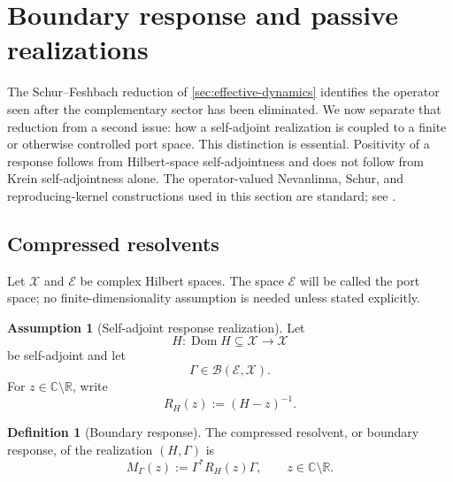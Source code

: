 \documentclass[11pt,reqno]{scrartcl}
\newcommand{\CC}{\mathbb C}
\newcommand{\RR}{\mathbb R}
\DeclareMathOperator{\Dom}{Dom}
\newcommand{\scrX}{\mathscr X}
\newcommand{\scrE}{\mathscr E}
\newcommand{\Mresp}{M_{\Gamma}}
\theoremstyle{plain}
\theoremstyle{definition}
\newtheorem{definition}[definition]{Definition}
\newtheorem{assumption}[assumption]{Assumption}
\theoremstyle{remark}
\begin{document}
\section{Boundary response and passive realizations}
\label{sec:boundary-response}

The Schur--Feshbach reduction of \cref{sec:effective-dynamics} identifies the
operator seen after the complementary sector has been eliminated.  We now
separate that reduction from a second issue: how a self-adjoint realization
is coupled to a finite or otherwise controlled port space.  This distinction
is essential.  Positivity of a response follows from Hilbert-space
self-adjointness and does not follow from Krein self-adjointness alone.
The operator-valued Nevanlinna, Schur, and reproducing-kernel constructions
used in this section are standard; see
\cite{Donoghue,Aronszajn,deBrangesRovnyak}.

\subsection{Compressed resolvents}

Let \(\scrX\) and \(\scrE\) be complex Hilbert spaces.  The space
\(\scrE\) will be called the port space; no finite-dimensionality assumption
is needed unless stated explicitly.

\begin{assumption}[Self-adjoint response realization]
\label{ass:selfadjoint-response}
Let
\begin{equation}
  H:\Dom H\subseteq\scrX\longrightarrow\scrX
  \label{eq:response-H}
\end{equation}
be self-adjoint and let
\begin{equation}
  \Gamma\in\mathcal B(\scrE,\scrX).
  \label{eq:response-Gamma}
\end{equation}
For \(z\in\CC\setminus\RR\), write
\begin{equation}
  R_H(z):=(H-z)^{-1}.
  \label{eq:response-resolvent}
\end{equation}
\end{assumption}

\begin{definition}[Boundary response]
\label{def:boundary-response}
The compressed resolvent, or boundary response, of the realization
\((H,\Gamma)\) is
\begin{equation}
  \boxed{
  \Mresp(z):=\Gamma^*R_H(z)\Gamma,
  \qquad z\in\CC\setminus\RR.}
  \label{eq:boundary-response}
\end{equation}
\end{definition}
\end{document}
